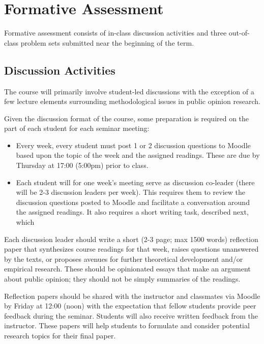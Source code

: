 \documentclass[12pt,a4paper]{article}
\begin{document}
\section{Formative Assessment}

Formative assessment consists of in-class discussion activities and three out-of-class problem sets submitted near the beginning of the term.

\subsection{Discussion Activities}

The course will primarily involve student-led discussions with the exception of a few lecture elements surrounding methodological issues in public opinion research.

Given the discussion format of the course, some preparation is required on the part of each student for each seminar meeting:

\begin{itemize}
\item Every week, every student must post 1 or 2 discussion questions to Moodle based upon the topic of the week and the assigned readings. These are due by Thursday at 17:00 (5:00pm) prior to class.
\item Each student will for one week's meeting serve as discussion co-leader (there will be 2-3 discussion leaders per week). This requires them to review the discussion questions posted to Moodle and facilitate a conversation around the assigned readings. It also requires a short writing task, described next, which 
\end{itemize}

Each discussion leader should write a short (2-3 page; max 1500 words) reflection paper that synthesizes course readings for that week, raises questions unanswered by the texts, or proposes avenues for further theoretical development and/or empirical research. These should be opinionated essays that make an argument about public opinion; they should not be simply summaries of the readings.

Reflection papers should be shared with the instructor and classmates via Moodle by Friday at 12:00 (noon) with the expectation that fellow students provide peer feedback during the seminar. Students will also receive written feedback from the instructor. These papers will help students to formulate and consider potential research topics for their final paper.
\end{document}
